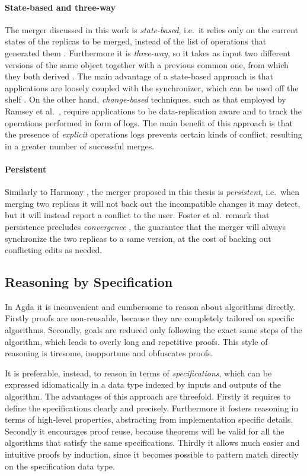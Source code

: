 \documentclass[../Thesis.tex]{subfiles}
\begin{document}
	\paragraph{State-based and three-way}
	The merger discussed in this work is \emph{state-based}, i.e.\ 
	it relies only on the current states of the replicas to be merged, instead
	of the list of operations that generated them \cite{PierceDiff3}.
	Furthermore it is \emph{three-way}, so it takes as input two different 
	versions of the same object together with a previous common one, 
	from which they both derived \cite{PierceDiff3}.	
	The main advantage of a state-based approach is that applications
	are loosely coupled with the synchronizer, which can be used
	off the shelf \cite{PierceDiff3}.
	On the other hand, \emph{change-based} techniques, such as 
	that employed by Ramsey et al.\ \cite{Ramsey01}, 
	require applications	to be data-replication aware
	and to track the operations performed in form of logs.
	The main benefit of this approach is that the presence of \emph{explicit}
	operations logs prevents certain kinds of conflict, resulting in a
	greater number of successful merges.
		
	\paragraph{Persistent}
	Similarly to Harmony \cite{Pierce07}, the merger proposed in 
	this thesis is \emph{persistent}, i.e.\ when merging two replicas 
	it will not back out the incompatible changes it may detect, 
	but it will instead report a conflict to the user.
	Foster et al.\ remark that persistence precludes 
	\emph{convergence} \cite{Pierce07}, the guarantee
	that the merger will always synchronize the two replicas to a same version, 
	at the cost of backing out conflicting edits as needed.
	
	\subsection{Reasoning by Specification}
	\label{subsec:spec}
	In Agda it is inconvenient and cumbersome to reason about algorithms directly.
	Firstly proofs are non-reusable, because they are completely tailored 
	on specific algorithms.
	Secondly, goals are reduced only following the exact same steps
	of the algorithm,	which leads to overly long and repetitive proofs. 
	This style of reasoning is tiresome, inopportune and obfuscates proofs.

	It is preferable, instead, to reason in terms of \emph{specifications}, which
	can be expressed idiomatically in a data type indexed by inputs
	and outputs of the algorithm. 
	The advantages of this approach are threefold.
	Firstly it requires to define the specifications clearly and precisely.
	Furthermore it fosters 	reasoning in terms of high-level properties, 
	abstracting from implementation specific details.
	Secondly it encourages proof reuse, because theorems will be valid for
	all the algorithms that satisfy the same specifications.
	Thirdly it allows much easier and intuitive proofs by induction, since it 
	becomes possible to pattern match directly on the specification data type.
	
\end{document}
